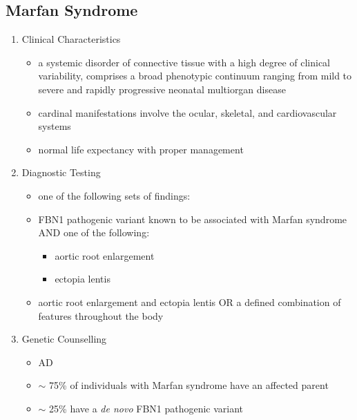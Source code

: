 \documentclass[12pt]{scrartcl}
\begin{document}
\subsection{Marfan Syndrome}
\label{sec:org9c1e27c}
\begin{enumerate}
\item Clinical Characteristics
\label{sec:orgca8f726}
\begin{itemize}
\item a systemic disorder of connective tissue with a high degree of
clinical variability, comprises a broad phenotypic continuum ranging
from mild to severe and rapidly progressive neonatal multiorgan
disease
\item cardinal manifestations involve the ocular, skeletal, and
cardiovascular systems
\item normal life expectancy with proper management
\end{itemize}
\item Diagnostic Testing
\label{sec:org8fe559e}
\begin{itemize}
\item one of the following sets of findings:

\item FBN1 pathogenic variant known to be associated with Marfan syndrome
AND one of the following:
\begin{itemize}
\item aortic root enlargement
\item ectopia lentis
\end{itemize}
\item aortic root enlargement and ectopia lentis OR a
defined combination of features throughout the body
\end{itemize}

\item Genetic Counselling
\label{sec:orgcb19dc9}
\begin{itemize}
\item AD
\item \(\sim\) 75\% of individuals with Marfan syndrome have an affected
parent
\item \(\sim\) 25\% have a \emph{de novo} FBN1 pathogenic variant
\end{itemize}
\end{enumerate}
\end{document}
